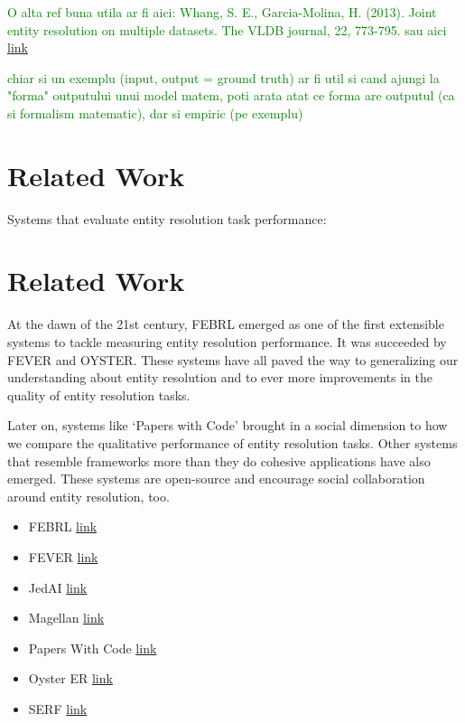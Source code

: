 \documentclass[11pt]{article}
\begin{document}
    \textcolor{green}{O alta ref buna utila ar fi aici: Whang, S. E., Garcia-Molina, H. (2013). Joint entity resolution
    on multiple datasets. The VLDB journal, 22, 773-795. sau aici}
    \href{https://pages.cs.wisc.edu/~anhai/papers1/deepmatcher-sigmod18.pdf}{link}

    \textcolor{green}{chiar si un exemplu (input, output = ground truth) ar fi util si cand ajungi la "forma" outputului unui model matem, poti arata atat ce forma are outputul (ca si formalism matematic), dar si empiric (pe exemplu)}

    \section[related]{Related Work}\label{section:related-work}

    Systems that evaluate entity resolution task performance:
    \section{Related Work}\label{sec:related}

    At the dawn of the 21st century, FEBRL\cite{febrl2002} emerged as one of the
    first extensible systems to tackle measuring entity resolution performance.
    It was succeeded by FEVER\cite{fever2009} and OYSTER\cite{oyster2012}. 
    These systems have all paved the way to generalizing our understanding about
    entity resolution and to ever more improvements in the quality of entity
    resolution tasks.

    Later on, systems like `Papers with Code'\cite{papwithcode2019} brought in
    a social dimension to how we compare the qualitative performance of entity
    resolution tasks.
    Other systems that resemble frameworks more than they do cohesive
    applications have also emerged\cite{magellan2020,jedai2017}.
    These systems are open-source and encourage social collaboration around
    entity resolution, too.

    \begin{itemize}
        \item FEBRL \href{http://users.cecs.anu.edu.au/~Peter.Christen/Febrl/febrl-0.3/febrldoc-0.3/manual.html}{link}
        \item FEVER \href{https://dbs.uni-leipzig.de/en/research/projects/data_integration/fever}{link}
        \item JedAI \href{https://github.com/scify/JedAIToolkit/tree/master}{link}
        \item Magellan \href{https://sites.google.com/site/anhaidgroup/current-projects/magellan?authuser=0}{link}
        \item Papers With Code \href{https://github.com/paperswithcode}{link}
        \item Oyster ER \href{https://bitbucket.org/oysterer/oyster/src/master/}{link}
        \item SERF \href{http://infolab.stanford.edu/serf/}{link}
    \end{itemize}
\end{document}
